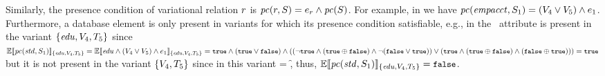 Similarly, the presence condition of variational relation $\vRel$ is
\ensuremath{\getPCfrom \vRel \vSch = \dimMeta_\vRel \wedge \getPC \vSch}.
For example, in  we have
\ensuremath{\getPCfrom \empacct {\vSch_1} = (\vFour \vee \vFive) \wedge \dimMeta_1}.
%
Furthermore, a database element is only present in variants for
which its presence condition satisfiable, e.g., in 
 the \isstudent\ attribute 
is present in the variant 
\ensuremath{\setDef {\edu, \vFour, \tFive}} since 
\ensuremath{\fSem [\setDef {\edu, \vFour, \tFive}] {\getPCfrom \isstudent {\vSch_1}}
= \fSem [\setDef {\edu, \vFour, \tFive}] {\edu \wedge (\vFour \vee \vFive) \wedge \dimMeta_1}
= \t \wedge (\t \vee \f) \wedge ((\neg \t \wedge (\t \oplus \f) \wedge \neg (\f \vee \t)) \vee (\t \wedge (\t \oplus \f) \wedge (\f \oplus \t))) = \t}
but it is not present in the variant
\ensuremath{\setDef{\vFour, \tFive}} since in this variant \edu = \f, thus,
\ensuremath{\fSem [\setDef {\edu, \vFour, \tFive}] {\getPCfrom \isstudent {\vSch_1}} = \f}.



